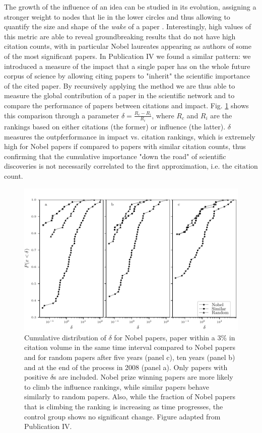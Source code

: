 The growth of the influence of an idea can be studied in its evolution, assigning a stronger weight to nodes
that lie in the lower circles and thus allowing to quantify the size and shape of the \textit{wake} of a paper \cite{10.1371/journal.pone.0113184}. Interestingly,
high values of this metric are able to reveal groundbreaking results that do not have high citation counts, with in particular Nobel laureates appearing as authors
of some of the most significant papers. In Publication IV we found a similar pattern: we introduced
a measure of the impact that a single paper has on the whole future corpus of science by allowing citing papers to "inherit" the scientific importance
of the cited paper. By recursively applying the method we are thus able to measure the global contribution of a paper in the scientific network and to compare the 
performance of papers between citations and impact. Fig. \ref{fig:nobel_impact} shows this comparison through a parameter $\delta = \frac{R_{c} - R_{i}}{R_{i}}$, where 
$R_{c}$ and $R_{i}$ are the rankings based on either citations (the former) or influence (the latter). $\delta$ measures
the outpferformance in impact vs. citation rankings, which is extremely high for Nobel papers if compared to papers with similar citation counts, thus
confirming that the cumulative importance "down the road" of scientific discoveries is not necessarily correlated to the first approximation, i.e.
the citation count.

\begin{figure}[h!]
\centering \large
\includegraphics[width=.8\linewidth]{Figures/nobel_ranking_nCit.pdf}

\caption{Cumulative distribution of $\delta$ for Nobel papers, paper within a $3\%$ in citation volume in the same time interval compared to Nobel papers and for random papers
after five years (panel c), ten years (panel b) and at the end of the process in 2008 (panel a). Only papers
with positive $\delta$s are included. Nobel prize winning papers are more likely to climb the influence rankings, while similar papers behave
similarly to random papers. Also, while the fraction of Nobel papers that is climbing the ranking is increasing as time progresses, the control group
shows no significant change. Figure adapted from Publication IV.}
\label{fig:nobel_impact}
\end{figure}

